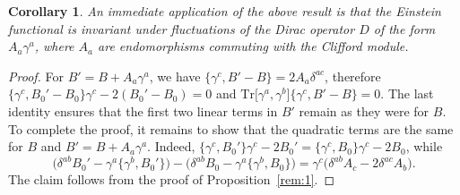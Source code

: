 \documentclass[pdftex]{sigma}
\numberwithin{equation}{section}
\newtheorem{Corollary}[Theorem]{Corollary}
\theoremstyle{definition}
\def\Tr{\mathrm{Tr}}
\begin{document}
\begin{Corollary} \label{example:fl}
	An immediate application of the above result is that the Einstein functional is invariant under fluctuations of the Dirac operator $D$ of the form $A_a \gamma^a$, where $A_a$ are endomorphisms commuting with the Clifford module.
\end{Corollary}
\begin{proof}
	For $B'=B+A_a\gamma^a$, we have $\{\gamma^c, B'-B\}=2A_a\delta^{ac}$, therefore $\{\gamma^c, B_0'-B_0\}\gamma^c - 2(B_0'-B_0)=0$ and $\Tr\bigl[\gamma^a,\gamma^b\bigr]\{\gamma^c, B'-B \}=0$. The last identity ensures that the first two linear terms in $B'$ remain as they were for $B$. To complete the proof, it remains to show that the quadratic terms are the same for $B$ and $B'=B+A_a\gamma^a$. Indeed, $\{\gamma^c, B_0'\}\gamma^c -2B_0'=\{\gamma^c, B_0\}\gamma^c - 2B_0$, while
	\[
	\bigl(\delta^{ab}B_0'-\gamma^a\bigl\{\gamma^b,B_0'\bigr\}\bigr)-\bigl(\delta^{ab}B_0 -\gamma^a \bigl\{\gamma^b, B_0\bigr\}\bigr)=\gamma^c \bigl(\delta^{ab} A_c -2\delta^{ac} A_b\bigr).
	\]
	The claim follows from the proof of Proposition~\ref{rem:1}.
\end{proof}
\end{document}
